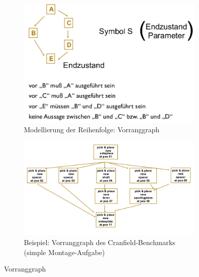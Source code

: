 \begin{figure}[h!]
	\centering
	\begin{subfigure}{.45\textwidth}
		\includegraphics[width=\textwidth]{figures/ch02_vg-mod.png}
		\caption{Modellierung der Reihenfolge: Vorranggraph}
	\end{subfigure}
	\begin{subfigure}{.45\textwidth}
		\includegraphics[width=\textwidth]{figures/ch02_vg-bsp.png}
		\caption{Beispiel: Vorranggraph des Cranfield-Benchmarks (simple Montage-Aufgabe)}
		\label{vg}
	\end{subfigure}
	\caption{Vorranggraph}
	\label{vg1}
\end{figure}
